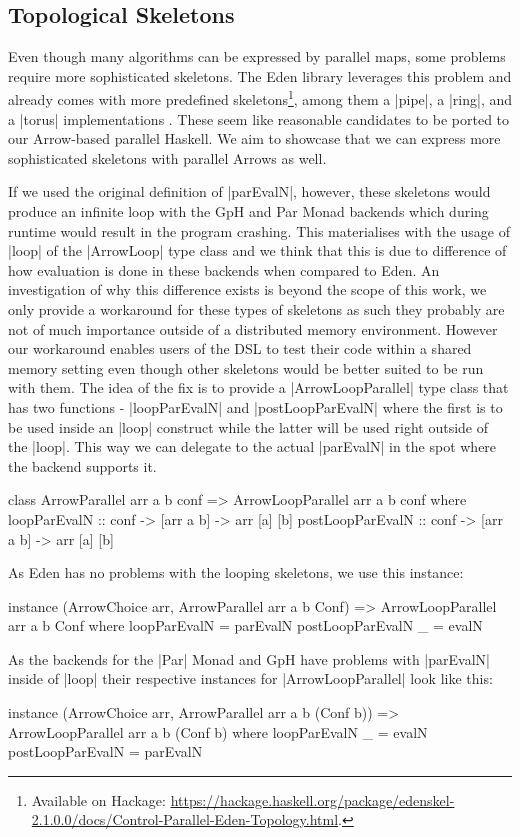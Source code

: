 \subsection{Topological Skeletons}
\label{sec:topology-skeletons}
Even though many algorithms can be expressed by parallel maps, some problems require more sophisticated skeletons. The Eden library leverages this problem and already comes with more predefined skeletons\footnote{Available on Hackage: \url{https://hackage.haskell.org/package/edenskel-2.1.0.0/docs/Control-Parallel-Eden-Topology.html}.}, among them a |pipe|, a |ring|, and a |torus| implementations \citep{Eden:SkeletonBookChapter02}. These seem like reasonable candidates to be ported to our Arrow-based parallel Haskell. We aim to showcase that we can express more sophisticated skeletons with parallel Arrows as well.

If we used the original definition of |parEvalN|, however, these skeletons would produce an infinite loop with the GpH and Par Monad backends which during runtime would result in the program crashing. This materialises with the usage of |loop| of the |ArrowLoop| type class and we think that this is due to difference of how evaluation is done in these backends when compared to Eden. An investigation of why this difference exists is beyond the scope of this work, we only provide a workaround for these types of skeletons as such they probably are not of much importance outside of a distributed memory environment. However our workaround enables users of the DSL to test their code within a shared memory setting even though other skeletons would be better suited to be run with them.
The idea of the fix is to provide a |ArrowLoopParallel| type class that has two functions - |loopParEvalN| and |postLoopParEvalN| where the first is to be used inside an |loop| construct while the latter will be used right outside of the |loop|. This way we can delegate to the actual |parEvalN| in the spot where the backend supports it.
\begin{code}
class ArrowParallel arr a b conf =>
	ArrowLoopParallel arr a b conf where
    loopParEvalN :: conf -> [arr a b] -> arr [a] [b]
    postLoopParEvalN :: conf -> [arr a b] -> arr [a] [b]
\end{code}
As Eden has no problems with the looping skeletons, we use this instance:
\begin{code}
instance (ArrowChoice arr, ArrowParallel arr a b Conf) =>
	ArrowLoopParallel arr a b Conf where
    loopParEvalN = parEvalN
    postLoopParEvalN _ = evalN
\end{code}
As the backends for the |Par| Monad and GpH have problems with |parEvalN| inside of |loop| their respective instances for |ArrowLoopParallel| look like this:
\begin{code}
instance (ArrowChoice arr, ArrowParallel arr a b (Conf b)) =>
	ArrowLoopParallel arr a b (Conf b) where
    loopParEvalN _ = evalN
    postLoopParEvalN = parEvalN
\end{code}

